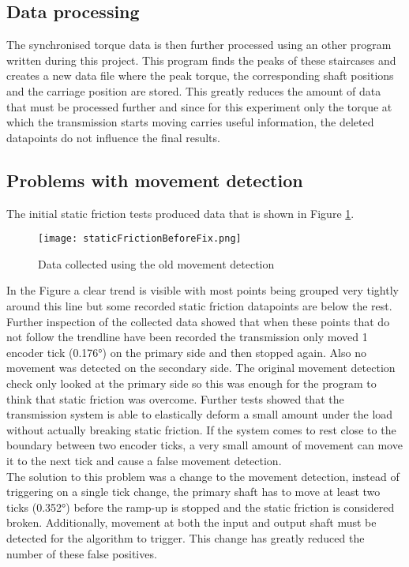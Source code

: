 \documentclass[12pt]{article}
\begin{document}
\subsection{Data processing}
The synchronised torque data is then further processed using an other program written during this project. This program finds the peaks of these staircases and creates a new data file where the peak torque, the corresponding shaft positions and the carriage position are stored. This greatly reduces the amount of data that must be processed further and since for this experiment only the torque at which the transmission starts moving carries useful information, the deleted datapoints do not influence the final results. 


\subsection{Problems with movement detection}
The initial static friction tests produced data that is shown in Figure \ref{fig:beforeFix}.  

\begin{figure}[h]
    \centering
    \texttt{[image: staticFrictionBeforeFix.png]}
    \caption{Data collected using the old movement detection}
    \label{fig:beforeFix}
\end{figure}

In the Figure a clear trend is visible with most points being grouped very tightly around this line but some recorded static friction datapoints are below the rest. Further inspection of the collected data showed that when these points that do not follow the trendline have been recorded the transmission only moved 1 encoder tick (0.176°) on the primary side and then stopped again. Also no movement was detected on the secondary side. The original movement detection check only looked at the primary side so this was enough for the program to think that static friction was overcome. Further tests showed that the transmission system is able to elastically deform a small amount under the load without actually breaking static friction. If the system comes to rest close to the boundary between two encoder ticks, a very small amount of movement can move it to the next tick and cause a false movement detection.\\

The solution to this problem was a change to the movement detection, instead of triggering on a single tick change, the primary shaft has to move at least two ticks (0.352°) before the ramp-up is stopped and the static friction is considered broken. Additionally, movement at both the input and output shaft must be detected for the algorithm to trigger. This change has greatly reduced the number of these false positives. 
\end{document}
